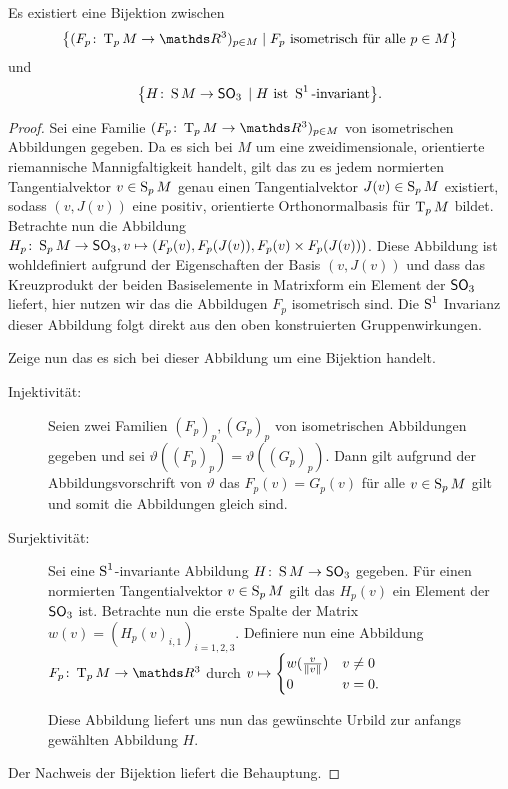 \begin{Satz}
  Es existiert eine Bijektion zwischen
  \begin{gather*}
    \set{ (\abb{F_p}{\TT_pM}{\R^3})_{p\in M} }{ F_p \text{ isometrisch
        für alle }p \in M}
  \end{gather*}
  und
  \begin{gather*}
    \set{ \abb{H}{\S M}{\so_3}}{H\text{ ist }\S^1 \text{-invariant}}.
  \end{gather*}
  \begin{proof}
    Sei eine Familie $(\abb{F_p}{\TT_pM}{\R^3})_{p\in M}$ von
    isometrischen Abbildungen gegeben.  Da es sich bei $M$ um eine
    zweidimensionale, orientierte riemannische Mannigfaltigkeit
    handelt, gilt das zu es jedem normierten Tangentialvektor
    $v \in \S_p M$ genau einen Tangentialvektor $J(v) \in \S_p M$
    existiert, sodass $(v,J(v))$ eine positiv, orientierte
    Orthonormalbasis für $\tang{p}{M}$ bildet. Betrachte nun die
    Abbildung $\abb{H_p}{\S_p%
      M}{\so_3}, v \mapsto (F_p(v),F_p(J(v)),F_p(v)\times F_p(J(v)))$.
    Diese Abbildung ist wohldefiniert aufgrund der Eigenschaften der
    Basis $(v,J(v))$ und dass das Kreuzprodukt der beiden
    Basiselemente in Matrixform ein Element der $\so_3$ liefert, hier nutzen wir das die Abbildugen $ F_p $ isometrisch sind.  Die
    $\S^1$ Invarianz dieser Abbildung folgt direkt aus den oben
    konstruierten Gruppenwirkungen.   
	
    Zeige nun das es sich bei dieser Abbildung um eine Bijektion
    handelt.
    \begin{description}
    \item[Injektivität:] Seien zwei Familien $(F_p)_p,(G_p)_p$ von
      isometrischen Abbildungen gegeben und sei
      $\vartheta((F_p)_p)=\vartheta((G_p)_p)$. Dann gilt aufgrund der
      Abbildungsvorschrift von $\vartheta$ das $F_p(v)=G_p(v)$ für
      alle $v \in \S_p M$ gilt und somit die Abbildungen gleich sind.
    \item[Surjektivität:] Sei eine $\S^1$-invariante Abbildung
      $\abb{H}{\S M}{\so_3}$ gegeben. Für einen normierten
      Tangentialvektor $v \in \S_p M$ gilt das $H_p(v)$ ein Element
      der $\so_3$ ist. Betrachte nun die erste Spalte der Matrix
      $w(v)=(H_p(v)_{i,1})_{i=1,2,3}$. Definiere nun eine Abbildung
      $\abb{F_p}{\tang{p}{M}}{\R^3}$ durch $v \mapsto \begin{cases}
        w(\frac{v}{\norm{v}}) & v \neq 0 \\
        0 & v=0.
      \end{cases}$
		
      Diese Abbildung liefert uns nun das gewünschte Urbild zur
      anfangs gewählten Abbildung $H$.
    \end{description}
    Der Nachweis der Bijektion liefert die Behauptung.
\end{proof}

\end{Satz}

